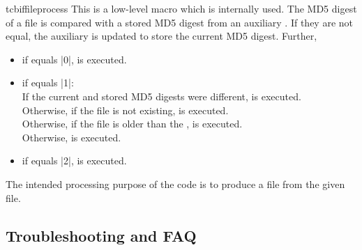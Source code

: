 \begin{docCommand}[doc new=2016-07-14]{tcbiffileprocess}{}
  This is a low-level macro which is internally used.
  The MD5 digest of a  file is compared with
  a stored MD5 digest from an auxiliary .
  If they are not equal, the auxiliary  is updated to
  store the current MD5 digest. Further,
  \begin{itemize}
  \item if  equals |0|,  is executed.
  \item if  equals |1|:\\
    If the current and stored MD5 digests were different,  is executed.\\
    Otherwise, if the  file is not existing,  is executed.\\
    Otherwise, if the  file is older than the ,  is executed.\\
    Otherwise,  is executed.
  \item if  equals |2|,  is executed.
  \end{itemize}
  The intended processing purpose of the  code is to produce a 
  file from the given  file.
\end{docCommand}


\clearpage
\subsection{Troubleshooting and FAQ}\label{subsec:external_troubleshooting}

